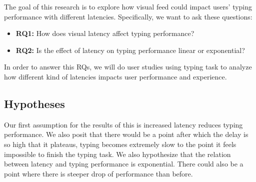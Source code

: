 The goal of this research is to explore how visual feed could impact users' typing performance with different latencies. Specifically, we want to ask these questions:
\begin{itemize}
	\item \textbf{RQ1:} How does visual latency affect typing performance?
	\item \textbf{RQ2:} Is the effect of latency on typing performance linear or exponential?
\end{itemize}
In order to answer this RQs, we will do user studies using typing task to analyze how different kind of latencies impacts user performance and experience.

\subsection{Hypotheses}

Our first assumption for the results of this is increased latency reduces typing performance. We also posit that there would be a point after which the delay is so high that it plateaus, typing becomes extremely slow to the point it feels impossible to finish the typing task. We also hypothesize that the relation between latency and typing performance is exponential. There could also be a point where there is steeper drop of performance than before.